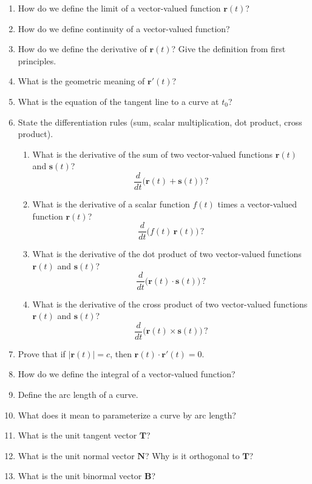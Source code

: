 \begin{enumerate}[resume]
  \item How do we define the limit of a vector-valued function $\mathbf{r}(t)$?
  \item How do we define continuity of a vector-valued function?
  \item How do we define the derivative of $\mathbf{r}(t)$? Give the definition from first principles.
  \item What is the geometric meaning of $\mathbf{r}'(t)$?
  \item What is the equation of the tangent line to a curve at $t_0$?
  \item State the differentiation rules (sum, scalar multiplication, dot product, cross product).
    \begin{enumerate}
      \item What is the derivative of the sum of two vector-valued functions $\mathbf{r}(t)$ and $\mathbf{s}(t)$?
        \[
          \frac{d}{dt}\big(\mathbf{r}(t) + \mathbf{s}(t)\big)\,?
        \]
      \item What is the derivative of a scalar function $f(t)$ times a vector-valued function $\mathbf{r}(t)$?
        \[
          \frac{d}{dt}\big(f(t)\,\mathbf{r}(t)\big)\,?
        \]
      \item What is the derivative of the dot product of two vector-valued functions $\mathbf{r}(t)$ and $\mathbf{s}(t)$?
        \[
          \frac{d}{dt}\big(\mathbf{r}(t)\cdot \mathbf{s}(t)\big)\,?
        \]
      \item What is the derivative of the cross product of two vector-valued functions $\mathbf{r}(t)$ and $\mathbf{s}(t)$?
        \[
          \frac{d}{dt}\big(\mathbf{r}(t)\times \mathbf{s}(t)\big)\,?
        \]
    \end{enumerate}
  \item Prove that if $|\mathbf{r}(t)| = c$, then $\mathbf{r}(t) \cdot \mathbf{r}'(t) = 0$.
  \item How do we define the integral of a vector-valued function?
  \item Define the arc length of a curve.
  \item What does it mean to parameterize a curve by arc length?
  \item What is the unit tangent vector $\mathbf{T}$?
  \item What is the unit normal vector $\mathbf{N}$? Why is it orthogonal to $\mathbf{T}$?
  \item What is the unit binormal vector $\mathbf{B}$?

\end{enumerate}
